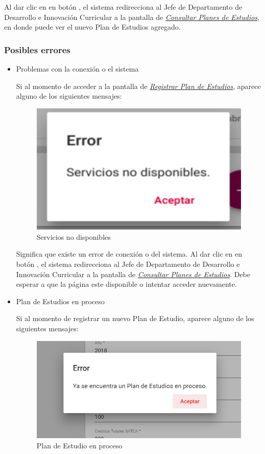 Al dar clic en en botón , el sistema redirecciona  al Jefe de Departamento de Desarrollo e Innovación Curricular a la pantalla de \hyperlink{consultarPE}{\textit{Consultar Planes de Estudios}}, en donde puede ver el nuevo Plan de Estudios agregado.\\
\newpage
\subsubsection{Posibles errores}
\begin{itemize}
	
	\item Problemas con la conexión o el sistema
	
	Si al momento de acceder a la pantalla de \hyperlink{registrarPE}{\textit{Registrar Plan de Estudios}}, aparece alguno de los siguientes mensajes:
		\begin{figure}[!hbtp]
		\centering
		\hypertarget{error}{\includegraphics[width=0.7\linewidth]{images/SP4-GPE/error}}
		\caption{Servicios no disponibles}
		\label{error}
		\end{figure}
	
	
	Significa que existe un error de conexión o del sistema. Al dar clic en en botón , el sistema redirecciona al Jefe de Departamento de Desarrollo e Innovación Curricular a la pantalla de \hyperlink{consultarPE}{\textit{Consultar Planes de Estudios}}. Debe esperar a que la página este disponible o intentar acceder nuevamente.
	\newpage
	\item Plan de Estudios en proceso
	
	Si al momento de registrar un nuevo Plan de Estudio, aparece alguno de los siguientes mensajes:
	\begin{figure}[!hbtp]
		\centering
		\hypertarget{error1}{\includegraphics[width=0.7\linewidth]{images/SP4-GPE/error1}}
		\caption{Plan de Estudio en proceso}
		\label{error1}
	\end{figure}
	

\end{itemize}
